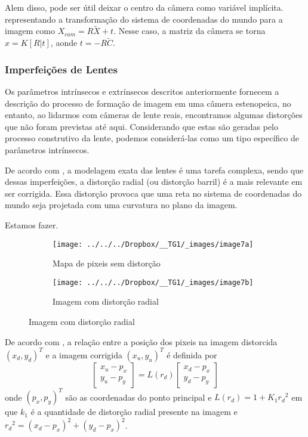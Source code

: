 \documentclass[ecp,tc]{iiufrgs}
\begin{document}
Alem disso, pode ser útil deixar o centro da câmera como variável implícita. representando a transformação do sistema de coordenadas do mundo para a imagem como $ X_{cam} = R\widetilde{X} + t $. Nesse caso, a matriz da câmera se torna $ x = K[R|t] $, aonde $ t = -R\widetilde{C} $.

\subsubsection{Imperfeições de Lentes}

Os parâmetros intrínsecos e extrínsecos descritos anteriormente fornecem a descrição do processo de formação de imagem em uma câmera estenopeica, no entanto, ao lidarmos com câmeras de lente reais, encontramos algumas distorções que não foram previstas
até aqui. Considerando que estas são geradas pelo processo construtivo da lente, podemos considerá-las como um tipo específico de parâmetros intrínsecos.

De acordo com , a modelagem exata das lentes é uma tarefa complexa, sendo que dessas imperfeições, a distorção radial (ou distorção barril) é a mais relevante em ser corrigida. Essa distorção provoca que uma reta no sistema de coordenadas do mundo seja projetada com uma curvatura no plano da imagem.

Estamos fazer.


\begin{figure}
	\centering
	\caption{Distorção radial}
	\begin{subfigure}[b]{0.4\textwidth}
		\texttt{[image: ../../../Dropbox/\_\_TG1/\_images/image7a]}
		\caption{Mapa de pixeis sem distorção}
		\label{fig:image7a}
	\end{subfigure}
	\quad
	\begin{subfigure}[b]{0.4\textwidth}
		\texttt{[image: ../../../Dropbox/\_\_TG1/\_images/image7b]}
		\caption{Imagem com distorção radial}
		\label{fig:image7b}
	\end{subfigure}
	\label{fig:image7}
\end{figure}

De acordo com , a relação entre a posição dos pixeis na imagem distorcida $ (x_d, y_d)^T $ e a imagem corrigida $ (x_u, y_u)^T $ é definida por
\[ \begin{bmatrix}x_u - p_x \\ y_u - p_y \end{bmatrix} = L(r_d)\begin{bmatrix}x_d - p_x \\ y_d - p_y \end{bmatrix}\]
onde $ (p_x, p_y)^T $ são as coordenadas do ponto principal e $ L(r_d) = 1+K_1{r_d}^2 $ em que $ k_1 $ é a quantidade de distorção radial presente na imagem e $ {r_d}^2 = (x_d - p_x)^2 + (y_d - p_x)^2 $.
\end{document}
